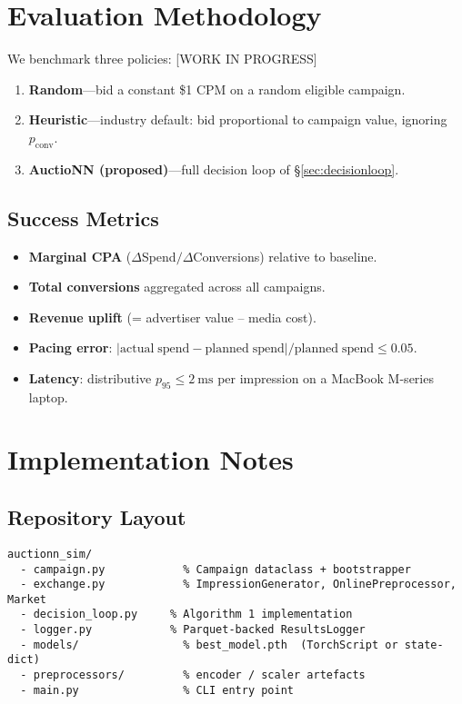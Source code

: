 \documentclass[11pt]{article}
\begin{document}
\section{Evaluation Methodology}\label{sec:evaluation}
We benchmark three policies: [WORK IN PROGRESS]

\begin{enumerate}
  \item \textbf{Random}—bid a constant \$1 CPM on a random eligible campaign.
  \item \textbf{Heuristic}—industry default: bid proportional to
    campaign value, ignoring $p_{\mathrm{conv}}$.
  \item \textbf{AuctioNN (proposed)}—full decision loop of
    §\ref{sec:decisionloop}.
\end{enumerate}

\subsection{Success Metrics}
\begin{itemize}
  \item \textbf{Marginal CPA}
    (\(\Delta\)Spend\(/\)\(\Delta\)Conversions) relative to baseline.
  \item \textbf{Total conversions} aggregated across all campaigns.
  \item \textbf{Revenue uplift} (= advertiser value – media cost).
  \item \textbf{Pacing error}:
    $|\mathrm{actual\;spend}-\mathrm{planned\;spend}|/\mathrm{planned\;spend}\le0.05$.
  \item \textbf{Latency}: distributive
    $p_{95}\le\SI{2}{\milli\second}$ per impression on a MacBook
    M-series laptop.
\end{itemize}

\section{Implementation Notes}\label{sec:implementation}

\subsection{Repository Layout}

\begin{verbatim}
auctionn_sim/
  - campaign.py            % Campaign dataclass + bootstrapper
  - exchange.py            % ImpressionGenerator, OnlinePreprocessor, Market
  - decision_loop.py     % Algorithm 1 implementation
  - logger.py            % Parquet-backed ResultsLogger
  - models/                % best_model.pth  (TorchScript or state-dict)
  - preprocessors/         % encoder / scaler artefacts
  - main.py                % CLI entry point
\end{verbatim}
\end{document}
